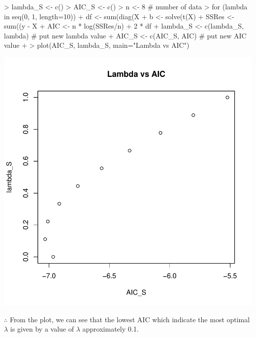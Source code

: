 \documentclass{article}
\begin{document}
\begin{Schunk}
\begin{Sinput}
> lambda_S <- c()
> AIC_S <- c()
> n <- 8  # number of data
> for (lambda in seq(0, 1, length=10)) {
+   df <- sum(diag(X %
+   b <- solve(t(X) %
+   SSRes <- sum((y - X %
+   AIC <- n * log(SSRes/n) + 2 * df
+   lambda_S <- c(lambda_S, lambda) # put new lambda value
+   AIC_S <- c(AIC_S, AIC) # put new AIC value
+ }
> plot(AIC_S, lambda_S, main="Lambda vs AIC")
\end{Sinput}
\end{Schunk}
\includegraphics{Assignment2-022}

\noindent $\therefore$ From the plot, we can see that the lowest AIC which indicate the most optimal $\lambda$ is given by a value of $\lambda$ approximately 0.1.
\end{document}
